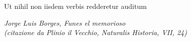 \begin{dedication}
Ut nihil non iisdem verbis redderetur auditum

\vspace{1em}
\textit{Jorge Luis Borges, Funes el memorioso}\\
\textit{(citazione da Plinio il Vecchio, Naturalis Historia, VII, 24)}
\end{dedication}
